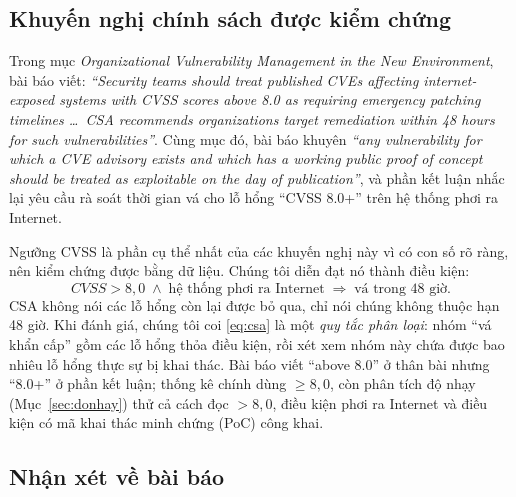 \documentclass[runningheads]{llncs}
\begin{document}
\subsection{Khuyến nghị chính sách được kiểm chứng}

Trong mục \emph{Organizational Vulnerability Management in the New Environment}, bài báo
viết: \emph{``Security teams should treat published CVEs affecting internet-exposed systems
with CVSS scores above 8.0 as requiring emergency patching timelines \ldots\ CSA recommends
organizations target remediation within 48 hours for such vulnerabilities''}. Cùng mục đó,
bài báo khuyên \emph{``any vulnerability for which a CVE advisory exists and which has a
working public proof of concept should be treated as exploitable on the day of publication''},
và phần kết luận nhắc lại yêu cầu rà soát thời gian vá cho lỗ hổng ``CVSS 8.0+'' trên hệ
thống phơi ra Internet.

Ngưỡng CVSS là phần cụ thể nhất của các khuyến nghị này vì có con số rõ ràng, nên kiểm chứng
được bằng dữ liệu. Chúng tôi diễn đạt nó thành điều kiện:
\begin{equation}
\mathit{CVSS} > 8{,}0 \;\wedge\; \text{hệ thống phơi ra Internet} \;\Longrightarrow\; \text{vá trong 48 giờ}.
\label{eq:csa}
\end{equation}
CSA không nói các lỗ hổng còn lại được bỏ qua, chỉ nói chúng không thuộc hạn 48 giờ. Khi đánh
giá, chúng tôi coi \eqref{eq:csa} là một \emph{quy tắc phân loại}: nhóm ``vá khẩn cấp'' gồm
các lỗ hổng thỏa điều kiện, rồi xét xem nhóm này chứa được bao nhiêu lỗ hổng thực sự bị khai thác.
Bài báo viết ``above 8.0'' ở thân bài nhưng ``8.0+'' ở phần kết luận; thống kê chính dùng
$\ge 8{,}0$, còn phân tích độ nhạy (Mục~\ref{sec:donhay}) thử cả cách đọc $> 8{,}0$, điều kiện
phơi ra Internet và điều kiện có mã khai thác minh chứng (PoC) công khai.

\subsection{Nhận xét về bài báo}
\end{document}
